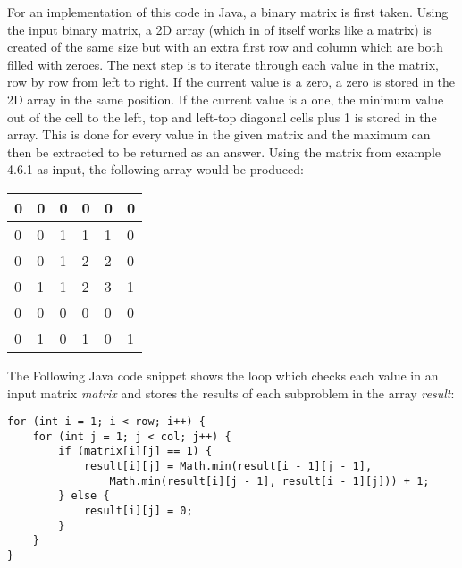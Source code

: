 
For an implementation of this code in Java, a binary matrix is first taken. Using the input binary matrix, a 2D array (which in of itself works like a matrix) is created of the same size but with an extra first row and column which are both filled with zeroes. The next step is to iterate through each value in the matrix, row by row from left to right. If the current value is a zero, a zero is stored in the 2D array in the same position. If the current value is a one, the minimum value out of the cell to the left, top and left-top diagonal cells plus 1 is stored in the array. This is done for every value in the given matrix and the maximum can then be extracted to be returned as an answer.
\smallbreak\noindent
Using the matrix from example 4.6.1 as input, the following array would be produced:

\begin{table}[h]
	\centering
	\begin{tabular}{|l|l|l|l|l|l|}
		\hline
		0 & 0 & 0 & 0 & 0 & 0 \\ \hline
		0 & 0 & 1 & 1 & 1 & 0 \\ \hline
		0 & 0 & 1 & 2 & 2 & 0 \\ \hline
		0 & 1 & 1 & 2 & 3 & 1 \\ \hline
		0 & 0 & 0 & 0 & 0 & 0 \\ \hline
		0 & 1 & 0 & 1 & 0 & 1 \\ \hline
	\end{tabular}
\end{table}

\smallbreak\noindent
The Following Java code snippet shows the loop which checks each value in an input matrix \textit{matrix} and stores the results of each subproblem in the array \textit{result}:

\begin{lstlisting}
for (int i = 1; i < row; i++) {
	for (int j = 1; j < col; j++) {
		if (matrix[i][j] == 1) {
			result[i][j] = Math.min(result[i - 1][j - 1],
				Math.min(result[i][j - 1], result[i - 1][j])) + 1;
		} else {
			result[i][j] = 0;
		}
	}
}
\end{lstlisting}

